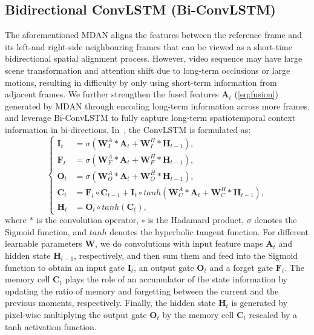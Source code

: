 \documentclass[review]{elsarticle}
\begin{document}
\subsection{Bidirectional ConvLSTM (Bi-ConvLSTM)}
The aforementioned MDAN aligns the features between the reference frame and its left-and right-side neighbouring frames that can be viewed as a short-time bidirectional spatial alignment process.
However, video sequence may have large scene transformation and attention shift due to long-term occlusions or large motions, resulting in difficulty by only using short-term information from adjacent frames.
We further strengthen the fused features $\bm{A}_t$ (\ref{eq:fusion}) generated by MDAN through encoding long-term information across more frames, and leverage Bi-ConvLSTM to fully capture long-term spatiotemporal context information in bi-directions.
In~\cite{xingjian2015convolutional}, the ConvLSTM is formulated as:
\begin{equation}
\label{al:convlstm}
\begin{cases}
\bm{I}_{t} &= \sigma(\bm{W}_{I}^{A} \ast \bm{A}_{t} + \bm{W}_{I}^{H} \ast \bm{H}_{t-1}),  \\
\bm{F}_{t} &= \sigma(\bm{W}_{F}^{A} \ast \bm{A}_{t} + \bm{W}_{F}^{H} \ast \bm{H}_{t-1}),  \\
\bm{O}_{t} &= \sigma(\bm{W}_{O}^{A} \ast \bm{A}_{t} + \bm{W}_{O}^{H} \ast \bm{H}_{t-1}), \\
\bm{C}_{t} &= \bm{F}_{t} \circ \bm{C}_{t-1} + \bm{I}_{t} \circ tanh(\bm{W}_{C}^{A} \ast \bm{A}_{t} + \bm{W}_{C}^{H} \ast \bm{H}_{t-1}),  \\
\bm{H}_{t} &= \bm{O}_{t} \circ tanh(\bm{C}_{t}),
\end{cases}
\end{equation}
where $\ast$ is the convolution operator, $\circ$ is the Hadamard product, $\sigma$ denotes the Sigmoid function, and $tanh$ denotes the hyperbolic tangent function.
For different learnable parameters $\bm{W}$, we do convolutions with input feature maps $\bm{A}_t$ and hidden state $\bm{H}_{t-1}$, respectively, and then sum them and feed into the Sigmoid function to obtain an input gate $\bm{I}_{t}$, an output gate $\bm{O}_{t}$ and a forget gate $\bm{F}_{t}$.
The memory cell $\bm{C}_{t}$ plays the role of an accumulator of the state information by updating the ratio of memory and forgetting between the current and the previous moments, respectively.
Finally, the hidden state $\bm{H}_{t}$ is generated by pixel-wise multiplying the output gate $\bm{O}_{t}$  by the memory cell $\bm{C}_{t}$ rescaled by a tanh activation function.
\end{document}
